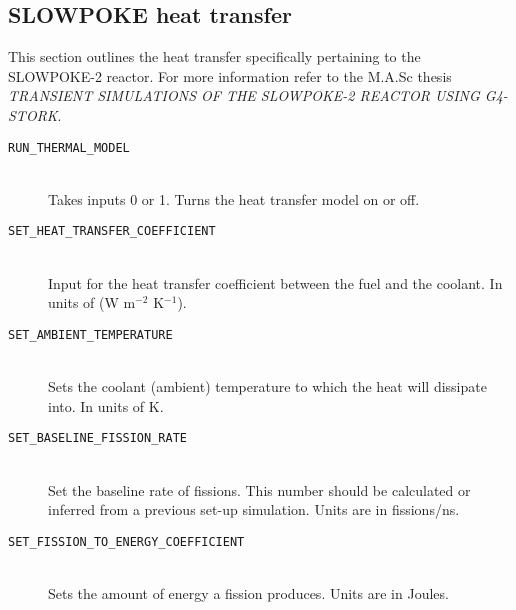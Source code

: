 \documentclass{article}
\begin{document}
\subsection{SLOWPOKE heat transfer}
This section outlines the heat transfer specifically pertaining to the SLOWPOKE-2 reactor. For more information refer to the M.A.Sc thesis \textit{TRANSIENT SIMULATIONS OF THE SLOWPOKE-2 REACTOR USING G4-STORK}.
\begin{description}
    \item[\texttt{RUN\_THERMAL\_MODEL}] \hfill \\
    Takes inputs 0 or 1. Turns the heat transfer model on or off.
    \item[\texttt{SET\_HEAT\_TRANSFER\_COEFFICIENT}] \hfill \\
    Input for the heat transfer coefficient between the fuel and the coolant. In units of (W m$^{-2}$ K$^{-1}$).
    \item[\texttt{SET\_AMBIENT\_TEMPERATURE}] \hfill \\
    Sets the coolant (ambient) temperature to which the heat will dissipate into. In units of K.
    \item[\texttt{SET\_BASELINE\_FISSION\_RATE}] \hfill \\
    Set the baseline rate of fissions. This number should be calculated or inferred from a previous set-up simulation. Units are in fissions/ns.
    \item[\texttt{SET\_FISSION\_TO\_ENERGY\_COEFFICIENT}] \hfill \\
    Sets the amount of energy a fission produces. Units are in Joules.
\end{description}

\end{document}
